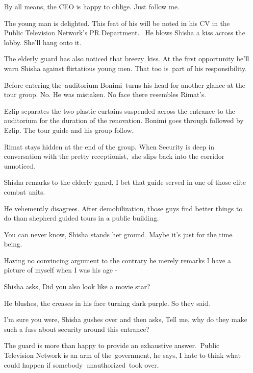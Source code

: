 \documentclass[twoside,11pt]{book}
\begin{document}
{\textquotedbl}By all means,{\textquotedbl} the CEO is happy to oblige. {\textquotedbl}Just follow me.{\textquotedbl}

The young man is delighted. This feat of his will be noted in his CV in the Public Television Network's PR Department.
~He blows Shisha a kiss across the lobby. She'll hang onto it.

The elderly guard has also noticed that breezy\ kiss. \MakeUppercase{A}t the first opportunity he'll warn Shisha against
flirtatious young men. That too is~part of his responsibility.\ 

Before entering the\ auditorium Bonimi\ turns his head for another glance at the tour group. No. He was mistaken. No
face there resembles Rimat's. 

Ezlip separates the two plastic curtains suspended across the entrance to the auditorium for the duration of the
renovation. Bonimi goes through followed by Ezlip. The tour guide and his group follow. 

Rimat stays hidden at the end of the group. When Security is deep in conversation with the pretty receptionist,\ she
slips back into the corridor unnoticed.

Shisha remarks to the elderly guard, {\textquotedbl}I bet that guide served in one of those elite combat
units.{\textquotedbl}\ \ 

He vehemently disagrees. {\textquotedbl}After demobilization, those guys find better things to do than shepherd guided
tours in a public building.{\textquotedbl} 

{\textquotedbl}You can never know,{\textquotedbl} Shisha stands her ground. {\textquotedbl}Maybe it's just for the time
being.{\textquotedbl} 

Having no convincing argument to the contrary he merely remarks {\textquotedbl}I have a picture of myself when I was his
age -{\textquotedbl}\ \ 

Shisha asks, {\textquotedbl}Did you also look like a movie star?{\textquotedbl} 

He blushes, the creases in his face turning dark purple. {\textquotedbl}So they said.{\textquotedbl}~ 

{\textquotedbl}I'm sure you were,{\textquotedbl} Shisha gushes over and then asks, {\textquotedbl}Tell me, why do they
make such a fuss about security around this entrance?{\textquotedbl} 

The guard is more than happy to provide an exhaustive answer.\ {\textquotedbl}Public Television Network is an arm of
the~government,{\textquotedbl} he says, {\textquotedbl}I hate to think what could happen if somebody~unauthorized~took
over.{\textquotedbl}
\end{document}
